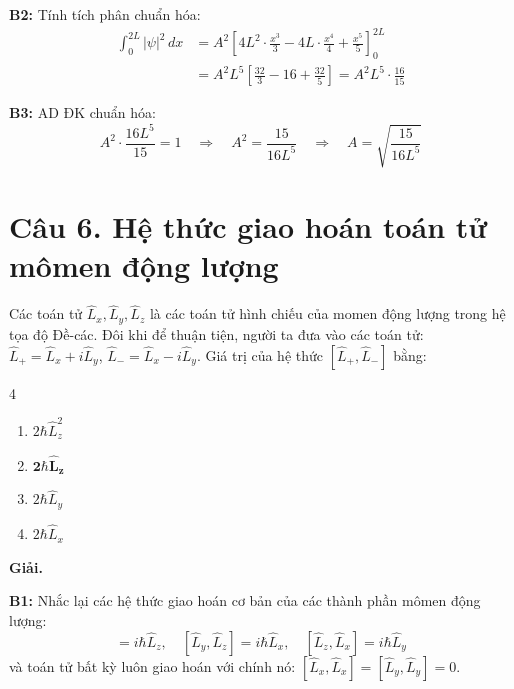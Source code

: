 \documentclass[11pt,a4paper]{article}
\begin{document}
\textbf{B2:} Tính tích phân chuẩn hóa:
\begin{align*}
    \int_0^{2L} |\psi|^2 \, dx &= A^2 \left[ 4L^2 \cdot \frac{x^3}{3} - 4L \cdot \frac{x^4}{4} + \frac{x^5}{5} \right]_0^{2L} \\
    &= A^2 L^5 \left[ \frac{32}{3} - 16 + \frac{32}{5} \right] = A^2 L^5 \cdot \frac{16}{15}
\end{align*}

\textbf{B3:} AD ĐK chuẩn hóa:
\begin{equation*}
    A^2 \cdot \frac{16 L^5}{15} = 1 \quad \Longrightarrow \quad A^2 = \frac{15}{16 L^5} \quad \Longrightarrow \quad A = \sqrt{\frac{15}{16 L^5}}
\end{equation*}

\vspace{0.5cm}

\section*{Câu 6. Hệ thức giao hoán toán tử mômen động lượng}

Các toán tử $\hat{L}_x, \hat{L}_y, \hat{L}_z$ là các toán tử hình chiếu của momen động lượng trong hệ tọa độ Đề-các. Đôi khi để thuận tiện, người ta đưa vào các toán tử: $\hat{L}_+ = \hat{L}_x + i\hat{L}_y$, $\hat{L}_- = \hat{L}_x - i\hat{L}_y$. Giá trị của hệ thức $[\hat{L}_+, \hat{L}_-]$ bằng:

\begin{multicols}{4}
\begin{enumerate}[label=\Alph*., itemsep=1pt, topsep=1pt, parsep=0pt, leftmargin=1.8em]
    \item $2\hbar\hat{L}_z^2$
    \item $\boldsymbol{2\hbar\hat{L}_z}$
    \item $2\hbar\hat{L}_y$
    \item $2\hbar\hat{L}_x$
\end{enumerate}
\end{multicols}

\textbf{Giải.}

\textbf{B1:} Nhắc lại các hệ thức giao hoán cơ bản của các thành phần mômen động lượng:
\begin{equation*}
    [\hat{L}_x, \hat{L}_y] = i\hbar\hat{L}_z, \quad [\hat{L}_y, \hat{L}_z] = i\hbar\hat{L}_x, \quad [\hat{L}_z, \hat{L}_x] = i\hbar\hat{L}_y
\end{equation*}
và toán tử bất kỳ luôn giao hoán với chính nó: $[\hat{L}_x, \hat{L}_x] = [\hat{L}_y, \hat{L}_y] = 0$.
\end{document}
